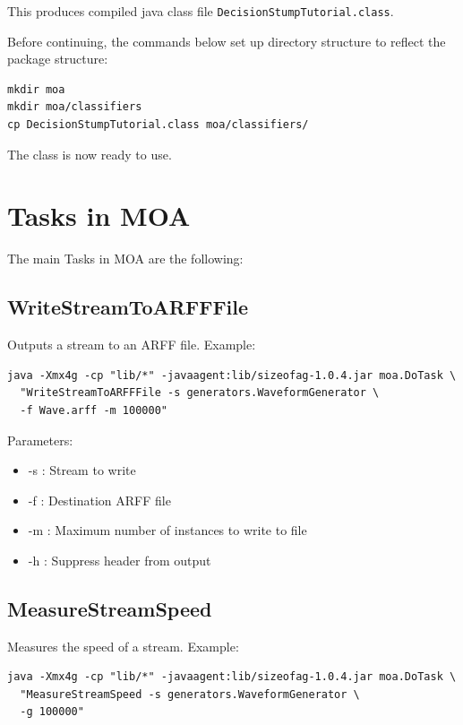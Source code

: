 \documentclass[a4paper,12pt,twoside]{book}
\begin{document}
This produces compiled java class file \verb+DecisionStumpTutorial.class+.

Before continuing, the commands below set up directory structure to reflect the package structure:

\begin{verbatim}
mkdir moa
mkdir moa/classifiers
cp DecisionStumpTutorial.class moa/classifiers/
\end{verbatim}

The class is now ready to use.



\chapter{Tasks in MOA}

The main Tasks in MOA are the following:



\section{WriteStreamToARFFFile} 

Outputs a stream to an ARFF file. 
Example:
\begin{footnotesize}\begin{verbatim}
java -Xmx4g -cp "lib/*" -javaagent:lib/sizeofag-1.0.4.jar moa.DoTask \
  "WriteStreamToARFFFile -s generators.WaveformGenerator \
  -f Wave.arff -m 100000" 
\end{verbatim}\end{footnotesize}

Parameters:
\begin{itemize}
\item -s : Stream to write
\item -f : Destination ARFF file
\item -m : Maximum number of instances to write to file
\item -h : Suppress header from output\end{itemize}

\section{MeasureStreamSpeed} 
Measures the speed of a stream. Example:

\begin{footnotesize}\begin{verbatim}
java -Xmx4g -cp "lib/*" -javaagent:lib/sizeofag-1.0.4.jar moa.DoTask \
  "MeasureStreamSpeed -s generators.WaveformGenerator \
  -g 100000" 
\end{verbatim}\end{footnotesize}
\end{document}
